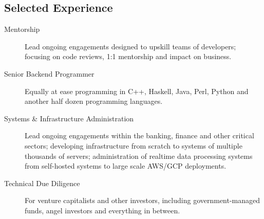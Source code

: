\begin{langen}
\section{Selected Experience}
\end{langen}

\vspace{4 mm}

\begin{langen}
\begin{description}%
\item[Mentorship] Lead ongoing engagements designed to upskill teams of developers; focusing on code reviews, 1:1 mentorship and impact on business.
\item[Senior Backend Programmer] Equally at ease programming in C++, Haskell, Java, Perl, Python and another half dozen programming languages.
\item[Systems \& Infrastructure Administration] Lead ongoing engagements within the banking, finance and other critical sectors; developing infrastructure from scratch to systems of multiple thousands of servers; administration of realtime data processing systems from self-hosted systems to large scale AWS/GCP deployments.
\item[Technical Due Diligence] For venture capitalists and other investors, including government-managed funds, angel investors and everything in between.
\end{description}
\end{langen}

\pagebreak

